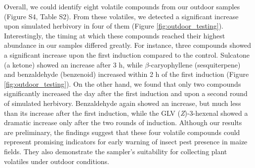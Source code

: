 Overall, we could identify eight volatile compounds from our outdoor samples (Figure S4, Table S2). From these volatiles, we detected a significant increase upon simulated herbivory in four of them (Figure \ref{fig:outdoor_testing}). Interestingly, the timing at which these compounds reached their highest abundance in our samples differed greatly. For instance, three compounds showed a significant increase upon the first induction compared to the control. Sulcatone (a ketone) showed an increase after 3 h, while $\beta$-caryophyllene (sesquiterpene) and benzaldehyde (benzenoid) increased within 2 h of the first induction (Figure \ref{fig:outdoor_testing}). On the other hand, we found that only two compounds significantly increased the day after the first induction and upon a second round of simulated herbivory. Benzaldehyde again showed an increase, but much less than its increase after the first induction, while the GLV (\textit{Z})-3-hexenal showed a dramatic increase only after the two rounds of induction. Although our results are preliminary, the findings suggest that these four volatile compounds could represent promising indicators for early warning of insect pest presence in maize fields. They also demonstrate the sampler's suitability for collecting plant volatiles under outdoor conditions. 

